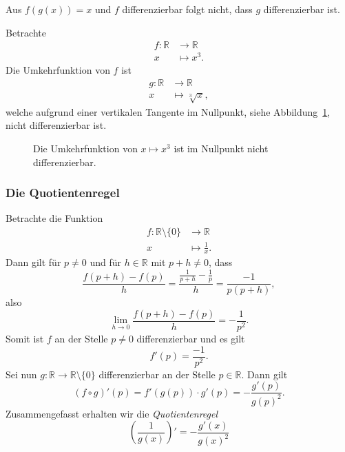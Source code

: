 \documentclass[../main.tex]{subfiles}
\begin{document}
\begin{warning}
  Aus $f(g(x)) = x$ und $f$ differenzierbar
  folgt nicht, dass $g$ differenzierbar ist.
\end{warning}

\begin{example}
  Betrachte
  \begin{align*}
    f \colon \mathbb{R} & \to \mathbb{R} \\
    x & \mapsto x^3.
  \end{align*}
  Die Umkehrfunktion von $f$ ist
  \begin{align*}
    g \colon \mathbb{R} & \to \mathbb{R} \\
    x & \mapsto \sqrt[3]{x},
  \end{align*}
  welche aufgrund einer vertikalen Tangente im
  Nullpunkt, siehe Abbildung~\ref{fig:cube},
  nicht differenzierbar ist.
  
\end{example}

\begin{figure}[htb] 
  \centering
  \begin{minipage}{0.40\textwidth}
    \centering
    
  \end{minipage}%
  \begin{minipage}{0.40\textwidth}
    \centering
    
  \end{minipage}%
  \caption{Die Umkehrfunktion von $x \mapsto x^3$
  ist im Nullpunkt nicht differenzierbar.}%
  \label{fig:cube}
\end{figure}

\subsubsection*{Die Quotientenregel}
Betrachte die Funktion
\begin{align*}
  f \colon \mathbb{R} \setminus \{0\} & \to \mathbb{R} \\
  x & \mapsto \frac{1}{x}.
\end{align*}
Dann gilt für 
$p \neq 0$ und für $h \in \mathbb{R}$ mit $p + h \neq 0$, dass
\[
  \frac{f(p+h) - f(p)}{h} = \frac{\frac{1}{p+h} - \frac{1}{p}}{h}
  = \frac{-1}{p(p+h)},
\]
also
\[
  \lim_{h \to 0} \frac{f(p+h) - f(p)}{h} = - \frac{1}{p^2}.
\]
Somit ist $f$ an der Stelle
$p \neq 0$ differenzierbar und es gilt
\[
  f'(p) = \frac{-1}{p^2}.
\]
Sei nun $g \colon \mathbb{R} \to \mathbb{R} \setminus \{0\}$ 
differenzierbar an der Stelle $p \in \mathbb{R}$.
Dann gilt
\[
  (f \circ g)'(p) = f'(g(p)) \cdot g'(p)
  = -\frac{g'(p)}{{g(p)}^2}.
\]
Zusammengefasst erhalten wir die \emph{Quotientenregel}
\[
  \left( \frac{1}{g(x)} \right)' = -\frac{g'(x)}{{g(x)}^2}
\]
\end{document}
